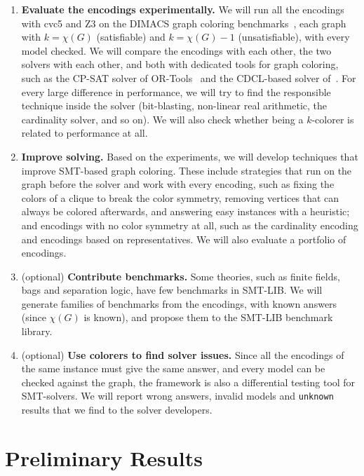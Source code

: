 \documentclass[12pt,a4paper]{article}
\theoremstyle{definition}
\begin{document}
\begin{enumerate}
  \item \textbf{Evaluate the encodings experimentally.} We will run all the encodings
    with cvc5 and Z3 on the DIMACS graph coloring benchmarks~\cite{JohnsonT96},
    each graph with $k = \chi(G)$ (satisfiable) and $k = \chi(G) - 1$
    (unsatisfiable), with every model checked. We will compare the encodings with
    each other, the two solvers with each other, and both with dedicated tools for
    graph coloring, such as the CP-SAT solver of OR-Tools~\cite{ortools} and
    the CDCL-based solver of~\cite{HebrardK18}. For every large difference in
    performance, we will try to find the responsible technique inside the solver
    (bit-blasting, non-linear real arithmetic, the cardinality solver, and so on).
    We will also check whether being a $k$-colorer is related to performance at all.

  \item \textbf{Improve solving.} Based on the experiments, we will develop
    techniques that improve SMT-based graph coloring. These include strategies that
    run on the graph before the solver and work with every encoding, such as fixing
    the colors of a clique to break the color symmetry, removing vertices that can
    always be colored afterwards, and answering easy instances with a heuristic; and
    encodings with no color symmetry at all, such as the cardinality encoding and
    encodings based on representatives. We will also evaluate a portfolio of
    encodings.

  \item (optional) \textbf{Contribute benchmarks.} Some theories, such as finite
    fields, bags and separation logic, have few benchmarks in SMT-LIB. We will
    generate families of benchmarks from the encodings, with known answers
    (since $\chi(G)$ is known), and propose them to the SMT-LIB benchmark
    library.

  \item (optional) \textbf{Use colorers to find solver issues.} Since all the
    encodings of the same instance must give the same answer, and every model can be
    checked against the graph, the framework is also a differential testing tool for
    SMT-solvers. We will report wrong answers, invalid models and
    \texttt{unknown} results that we find to the solver developers.
\end{enumerate}

\section{Preliminary Results}\label{sec:prelim}
\end{document}
